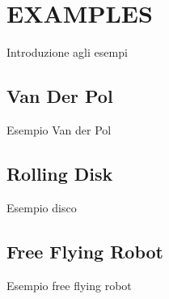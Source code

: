 \section*{EXAMPLES}
Introduzione agli esempi 

\subsection*{Van Der Pol}
Esempio Van der Pol

\subsection*{Rolling Disk}
Esempio disco

\subsection*{Free Flying Robot}
Esempio free flying robot

